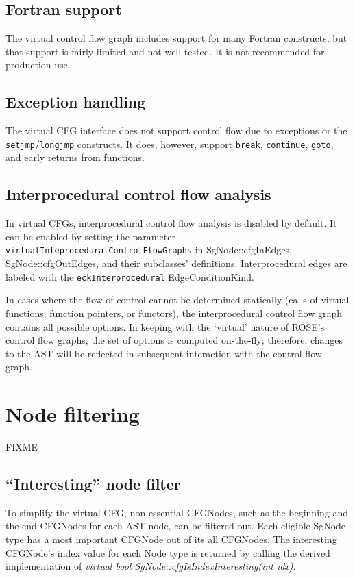 \subsection{Fortran support}

The virtual control flow graph includes support for many Fortran
constructs, but that support is fairly limited and not well tested.  It is
not recommended for production use.

\subsection{Exception handling}

The virtual CFG interface does not support control flow due to exceptions
or the \lstinline{setjmp}/\lstinline{longjmp} constructs.
It does, however, support \lstinline{break}, \lstinline{continue},
\lstinline{goto}, and early returns from functions.

\subsection{Interprocedural control flow analysis}

In virtual CFGs, interprocedural control flow analysis is disabled by default. It can be enabled
by setting the parameter \texttt{virtualInteproceduralControlFlowGraphs} in SgNode::cfgInEdges, 
SgNode::cfgOutEdges, and their subclasses' definitions. Interprocedural edges are labeled 
with the \texttt{eckInterprocedural} EdgeConditionKind.

In cases where the flow of control cannot be determined statically (calls of virtual
functions, function pointers, or functors), the interprocedural control flow
graph contains all possible options. In keeping with the `virtual' nature of
ROSE's control flow graphs, the set of options is computed on-the-fly;
therefore, changes to the AST will be reflected in subsequent interaction with
the control flow graph.  


\section{Node filtering}

FIXME

\subsection{``Interesting'' node filter}
\label{interesting_node_filter}
To simplify the virtual CFG, non-essential CFGNodes, such as the beginning
and the end CFGNodes for each AST node, can be filtered out. 
Each eligible SgNode type has a most important CFGNode out of its all
CFGNodes. The interesting CFGNode's index value for each Node type is returned by calling
the derived implementation of \textit {virtual bool SgNode::cfgIsIndexInteresting(int idx)}. 

